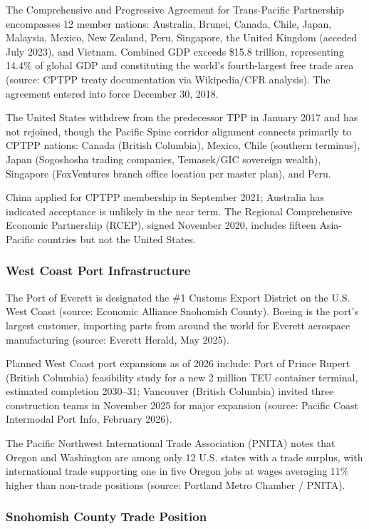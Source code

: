 \documentclass[11pt,letterpaper]{article}
\begin{document}
The Comprehensive and Progressive Agreement for Trans-Pacific Partnership encompasses 12 member nations: Australia, Brunei, Canada, Chile, Japan, Malaysia, Mexico, New Zealand, Peru, Singapore, the United Kingdom (acceded July 2023), and Vietnam. Combined GDP exceeds \$15.8 trillion, representing 14.4\% of global GDP and constituting the world's fourth-largest free trade area (source: CPTPP treaty documentation via Wikipedia/CFR analysis). The agreement entered into force December 30, 2018.

The United States withdrew from the predecessor TPP in January 2017 and has not rejoined, though the Pacific Spine corridor alignment connects primarily to CPTPP nations: Canada (British Columbia), Mexico, Chile (southern terminus), Japan (Sogoshosha trading companies, Temasek/GIC sovereign wealth), Singapore (FoxVentures branch office location per master plan), and Peru.

China applied for CPTPP membership in September 2021; Australia has indicated acceptance is unlikely in the near term. The Regional Comprehensive Economic Partnership (RCEP), signed November 2020, includes fifteen Asia-Pacific countries but not the United States.

\subsubsection{West Coast Port Infrastructure}

The Port of Everett is designated the \#1 Customs Export District on the U.S. West Coast (source: Economic Alliance Snohomish County). Boeing is the port's largest customer, importing parts from around the world for Everett aerospace manufacturing (source: Everett Herald, May 2025).

Planned West Coast port expansions as of 2026 include: Port of Prince Rupert (British Columbia) feasibility study for a new 2 million TEU container terminal, estimated completion 2030--31; Vancouver (British Columbia) invited three construction teams in November 2025 for major expansion (source: Pacific Coast Intermodal Port Info, February 2026).

The Pacific Northwest International Trade Association (PNITA) notes that Oregon and Washington are among only 12 U.S. states with a trade surplus, with international trade supporting one in five Oregon jobs at wages averaging 11\% higher than non-trade positions (source: Portland Metro Chamber / PNITA).

\subsubsection{Snohomish County Trade Position}
\end{document}
